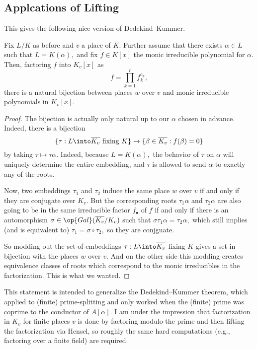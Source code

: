 \subsection{Applcations of Lifting}
This gives the following nice version of Dedekind--Kummer.
\begin{proposition}
	Fix $L/K$ as before and $v$ a place of $K.$ Further assume that there exists $\alpha\in L$ such that $L=K(\alpha),$ and fix $f\in K[x]$ the monic irreducible polynomial for $\alpha.$ Then, factoring $f$ into $K_v[x]$ as
	\[f=\prod_{k=1}^rf_k^{e_k},\]
	there is a natural bijection between places $w$ over $v$ and monic irreducible polynomials in $K_v[x].$
\end{proposition}
\begin{proof}
	The bijection is actually only natural up to our $\alpha$ chosen in advance. Indeed, there is a bijection
	\[\{\tau:L\into\overline{K_v}\text{ fixing }K\}\to\{\beta\in\overline{K_v}:f(\beta)=0\}\]
	by taking $\tau\mapsto\tau\alpha.$ Indeed, because $L=K(\alpha),$ the behavior of $\tau$ on $\alpha$ will uniquely determine the entire embedding, and $\tau$ is allowed to send $\alpha$ to exactly any of the roots.

	Now, two embeddings $\tau_1$ and $\tau_2$ induce the same place $w$ over $v$ if and only if they are conjugate over $K_v.$ But the corresponding roots $\tau_1\alpha$ and $\tau_2\alpha$ are also going to be in the same irreducible factor $f_\bullet$ of $f$ if and only if there is an automorphism $\sigma\in\op{Gal}(\overline{K_v}/K_v)$ such that $\sigma\tau_1\alpha=\tau_2\alpha,$ which still implies (and is equivalent to) $\tau_1=\sigma\circ\tau_2,$ so they are conjguate.

	So modding out the set of embeddings $\tau:L\into\overline{K_v}$ fixing $K$ gives a set in bijection with the places $w$ over $v.$ And on the other side this modding creates equivalence classes of roots which correspond to the monic irreducibles in the factorization. This is what we wanted.
\end{proof}
\begin{remark}
	This statement is intended to generalize the Dedekind--Kummer theorem, which applied to (finite) prime-splitting and only worked when the (finite) prime was coprime to the conductor of $A[\alpha].$ I am under the impression that factorization in $K_v$ for finite places $v$ is done by factoring modulo the prime and then lifting the factorization via Hensel, so roughly the same hard computations (e.g., factoring over a finite field) are required.
\end{remark}
